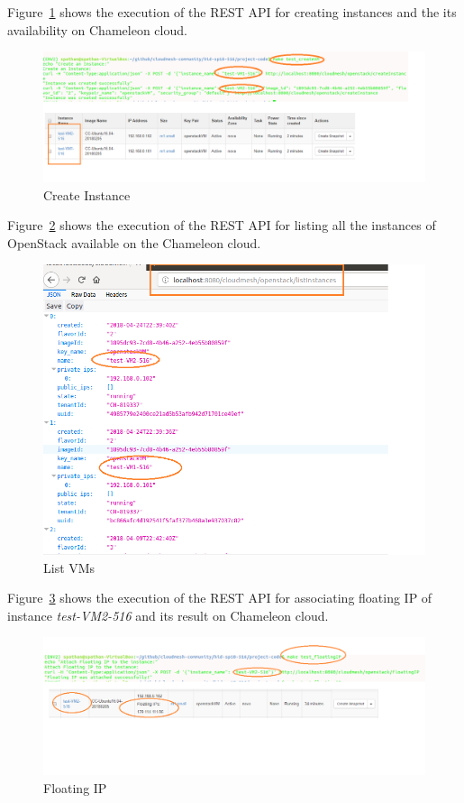 Figure~\ref{fig:createVM} shows the execution of the REST API for creating
instances and the its availability on Chameleon cloud.

\begin{figure}[!ht]
        \centering\includegraphics[width=\columnwidth]{images/createVM.png}
        \caption{Create Instance}\label{fig:createVM}
\end{figure}

Figure~\ref{fig:listVM} shows the execution of the REST API for listing all the
instances of OpenStack available on the Chameleon cloud. 

\begin{figure}[!ht]
        \centering\includegraphics[width=\columnwidth]{images/listVMs.png}
        \caption{List VMs}\label{fig:listVM}
\end{figure}

Figure~\ref{fig:floatingIP} shows the execution of the REST API for associating
floating IP of instance \textit{test-VM2-516} and its result on Chameleon 
cloud.

\begin{figure}[!ht]
        \centering\includegraphics[width=\columnwidth]{images/floatingip.png}
        \caption{Floating IP}\label{fig:floatingIP}
\end{figure}

